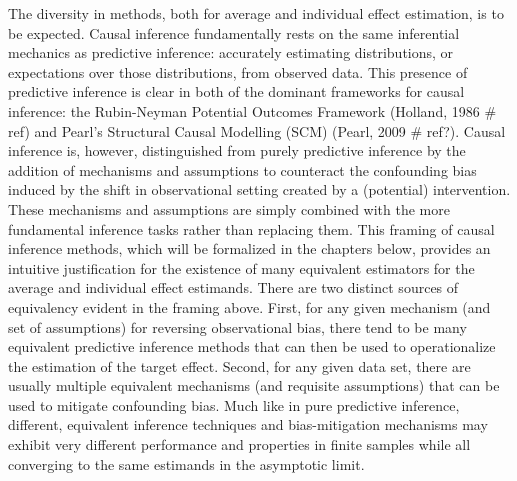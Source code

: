 \documentclass[../main.tex]{subfiles}
\begin{document}
\vspace{\baselineskip}
The diversity in methods, both for average and individual effect estimation, is to be expected. Causal inference fundamentally rests on the same inferential mechanics as predictive inference: accurately estimating distributions, or expectations over those distributions, from observed data. This presence of predictive inference\textit{ }is clear in both of the dominant frameworks for causal inference: the Rubin-Neyman Potential Outcomes Framework (Holland, 1986 $\#$ ref) and Pearl’s Structural Causal Modelling (SCM) (Pearl, 2009 $\#$ ref?). Causal inference is, however, distinguished from purely predictive inference by the addition of mechanisms and assumptions to counteract the confounding bias induced by the shift in observational setting created by a (potential) intervention. These mechanisms and assumptions are simply combined with the more fundamental inference tasks rather than replacing them. This framing of causal inference methods, which will be formalized in the chapters below, provides an intuitive justification for the existence of many equivalent estimators for the average and individual effect estimands. There are two distinct sources of equivalency evident in the framing above. First, for any given mechanism (and set of assumptions) for reversing observational bias, there tend to be many equivalent predictive inference methods that can then be used to operationalize the estimation of the target effect. Second, for any given data set, there are usually multiple equivalent mechanisms (and requisite assumptions) that can be used to mitigate confounding bias. Much like in pure predictive inference, different, equivalent inference techniques and bias-mitigation mechanisms may exhibit very different performance and properties in finite samples while all converging to the same estimands in the asymptotic limit.\par
\end{document}

